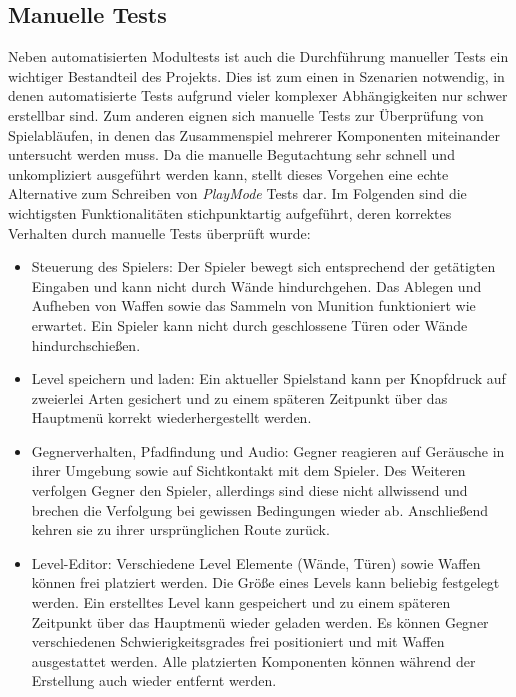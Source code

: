 





\subsection{Manuelle Tests}

Neben automatisierten Modultests ist auch die Durchführung manueller Tests ein wichtiger Bestandteil des Projekts. Dies ist zum einen in Szenarien notwendig, in denen automatisierte Tests aufgrund vieler komplexer Abhängigkeiten nur schwer erstellbar sind. Zum anderen eignen sich manuelle Tests zur Überprüfung von Spielabläufen, in denen das Zusammenspiel mehrerer Komponenten miteinander untersucht werden muss. Da die manuelle Begutachtung sehr schnell und unkompliziert ausgeführt werden kann, stellt dieses Vorgehen eine echte Alternative zum Schreiben von \textit{PlayMode} Tests dar. Im Folgenden sind die wichtigsten Funktionalitäten stichpunktartig aufgeführt, deren korrektes Verhalten durch manuelle Tests überprüft wurde: 

\begin{itemize}
\item Steuerung des Spielers: Der Spieler bewegt sich entsprechend der getätigten Eingaben und kann nicht durch Wände hindurchgehen. Das Ablegen und Aufheben von Waffen sowie das Sammeln von Munition funktioniert wie erwartet. Ein Spieler kann nicht durch geschlossene Türen oder Wände hindurchschießen.  
\item Level speichern und laden: Ein aktueller Spielstand kann per Knopfdruck auf zweierlei Arten gesichert und zu einem späteren Zeitpunkt über das Hauptmenü korrekt wiederhergestellt werden. 
\item Gegnerverhalten, Pfadfindung und Audio: Gegner reagieren auf Geräusche in ihrer Umgebung sowie auf Sichtkontakt mit dem Spieler. Des Weiteren verfolgen Gegner den Spieler, allerdings sind diese nicht allwissend und brechen die Verfolgung bei gewissen Bedingungen wieder ab. Anschließend kehren sie zu ihrer ursprünglichen Route zurück. 
\item Level-Editor: Verschiedene Level Elemente (Wände, Türen) sowie Waffen können frei platziert werden. Die Größe eines Levels kann beliebig festgelegt werden. Ein erstelltes Level kann gespeichert und zu einem späteren Zeitpunkt über das Hauptmenü wieder geladen werden. Es können Gegner verschiedenen Schwierigkeitsgrades frei positioniert und mit Waffen ausgestattet werden. Alle platzierten Komponenten können während der Erstellung auch wieder entfernt werden. 
\end{itemize}

